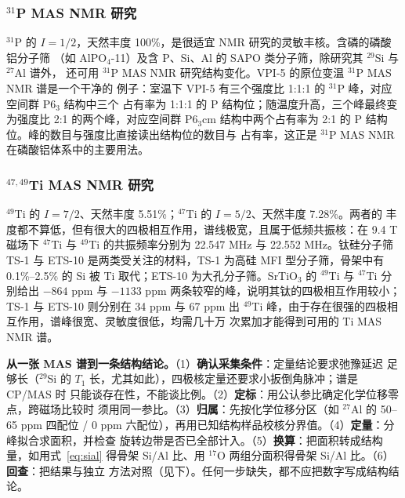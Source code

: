 \subsubsection{$^{31}$P MAS NMR 研究}

$^{31}$P 的 $I=1/2$，天然丰度 100\%，是很适宜 NMR 研究的灵敏丰核。含磷的磷酸铝分子筛
（如 AlPO$_{4}$-11）及含 P、Si、Al 的 SAPO 类分子筛，除研究其 $^{29}$Si 与 $^{27}$Al 谱外，
还可用 $^{31}$P MAS NMR 研究结构变化。VPI-5 的原位变温 $^{31}$P MAS NMR 谱是一个干净的
例子：室温下 VPI-5 有三个强度比 1:1:1 的 $^{31}$P 峰，对应空间群 P6$_{3}$ 结构中三个
占有率为 1:1:1 的 P 结构位；随温度升高，三个峰最终变为强度比 2:1 的两个峰，对应空间群
P6$_{3}$cm 结构中两个占有率为 2:1 的 P 结构位。峰的数目与强度比直接读出结构位的数目与
占有率，这正是 $^{31}$P MAS NMR 在磷酸铝体系中的主要用法。

\subsubsection{$^{47,49}$Ti MAS NMR 研究}

$^{49}$Ti 的 $I=7/2$、天然丰度 5.51\%；$^{47}$Ti 的 $I=5/2$、天然丰度 7.28\%。两者的
丰度都不算低，但有很大的四极相互作用，谱线极宽，且属于低频共振核：在 9.4 T 磁场下
$^{47}$Ti 与 $^{49}$Ti 的共振频率分别为 22.547 MHz 与 22.552 MHz。钛硅分子筛 TS-1 与
ETS-10 是两类受关注的材料，TS-1 为高硅 MFI 型分子筛，骨架中有 0.1\%--2.5\% 的 Si 被 Ti
取代；ETS-10 为大孔分子筛。SrTiO$_{3}$ 的 $^{49}$Ti 与 $^{47}$Ti 分别给出 $-864$ ppm 与
$-1133$ ppm 两条较窄的峰，说明其钛的四极相互作用较小；TS-1 与 ETS-10 则分别在 34 ppm
与 67 ppm 出 $^{49}$Ti 峰，由于存在很强的四极相互作用，谱峰很宽、灵敏度很低，均需几十万
次累加才能得到可用的 Ti MAS NMR 谱。

\begin{dataflow}
\textbf{从一张 MAS 谱到一条结构结论。}（1）\textbf{确认采集条件}：定量结论要求弛豫延迟
足够长（$^{29}$Si 的 $T_1$ 长，尤其如此），四极核定量还要求小扳倒角脉冲；谱是 CP/MAS 时
只能谈存在性，不能谈比例。（2）\textbf{定标}：用公认参比确定化学位移零点，跨磁场比较时
须用同一参比。（3）\textbf{归属}：先按化学位移分区（如 $^{27}$Al 的 50--65 ppm 四配位 /
0 ppm 六配位），再用已知结构样品校核分界值。（4）\textbf{定量}：分峰拟合求面积，并检查
旋转边带是否已全部计入。（5）\textbf{换算}：把面积转成结构量，如用式~\eqref{eq:sial}
得骨架 Si/Al 比、用 $^{17}$O 两组分面积得骨架 Si/Al 比。（6）\textbf{回查}：把结果与独立
方法对照（见下）。任何一步缺失，都不应把数字写成结构结论。
\end{dataflow}

